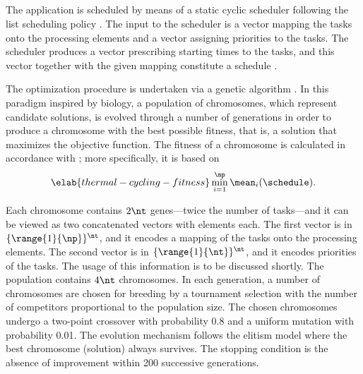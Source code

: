 \subsection{\solutiontitle}

The application is scheduled by means of a static cyclic scheduler following the
list scheduling policy \cite{adam1974}. The input to the scheduler is a vector
mapping the tasks onto the processing elements and a vector assigning priorities
to the tasks. The scheduler produces a vector prescribing starting times to the
tasks, and this vector together with the given mapping constitute a schedule
\schedule.

The optimization procedure is undertaken via a genetic algorithm
\cite{schmitz2004}. In this paradigm inspired by biology, a population of
chromosomes, which represent candidate solutions, is evolved through a number of
generations in order to produce a chromosome with the best possible fitness,
that is, a solution that maximizes the objective function. The fitness of a
chromosome is calculated in accordance with ;
more specifically, it is based on
\begin{equation} \elab{thermal-cycling-fitness}
  \min_{i = 1}^\np \mean_i(\schedule).
\end{equation}

Each chromosome contains $2 \nt$ genes---twice the number of tasks---and it can
be viewed as two concatenated vectors with \nt elements each. The first vector
is in $\{ \range{1}{\np} \}^\nt$, and it encodes a mapping of the tasks onto the
processing elements. The second vector is in $\{ \range{1}{\nt} \}^\nt$, and it
encodes priorities of the tasks. The usage of this information is to be
discussed shortly. The population contains $4 \nt$ chromosomes. In each
generation, a number of chromosomes are chosen for breeding by a tournament
selection with the number of competitors proportional to the population size.
The chosen chromosomes undergo a two-point crossover with probability 0.8 and a
uniform mutation with probability 0.01. The evolution mechanism follows the
elitism model where the best chromosome (solution) always survives. The stopping
condition is the absence of improvement within 200 successive generations.

